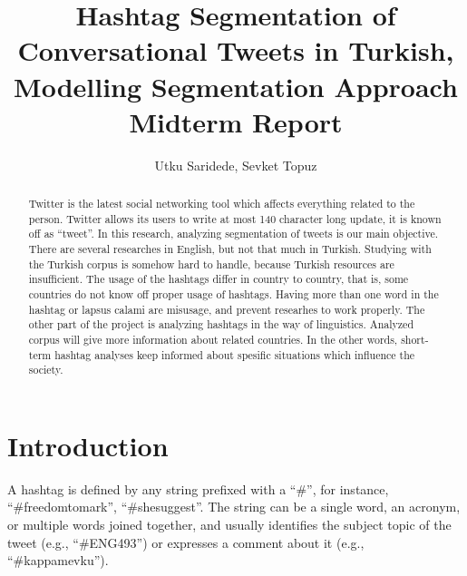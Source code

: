 \documentclass[12pt]{comjnl}
\begin{document}
\title[Hashtag Segmentation of Conversational Tweets in Turkish]{Hashtag Segmentation of Conversational Tweets in Turkish, Modelling Segmentation Approach Midterm Report}
\author{Utku Saridede, Sevket Topuz}
 




\begin{abstract}
Twitter is the latest social networking tool which affects everything related to the person.
Twitter allows its users to write at most 140 character long update, it is known off as 
``tweet''. In this research, analyzing segmentation of tweets is our main objective. There are
several researches in English, but not that much in Turkish. Studying with the Turkish corpus is
somehow hard to handle, because Turkish resources are insufficient. The usage of the hashtags
differ in country to country, that is, some countries do not know off proper usage of hashtags.
Having more than one word in the hashtag or lapsus calami are misusage, and prevent researhes 
to work properly. The other part of the project is analyzing hashtags in the way of linguistics.
Analyzed corpus will give more information about related countries. In the other words, short-term
hashtag analyses keep informed about spesific situations which influence the society.
\end{abstract}

\maketitle

\section{Introduction}
A hashtag is defined by any string prefixed with a ``\#'', for instance, “\#freedomtomark”,
“\#shesuggest”. The string can be a single word, an acronym, or multiple words joined
together, and usually identifies the subject topic of the tweet (e.g., “\#ENG493”)
or expresses a comment about it (e.g., “\#kappamevku”). 
\end{document}
